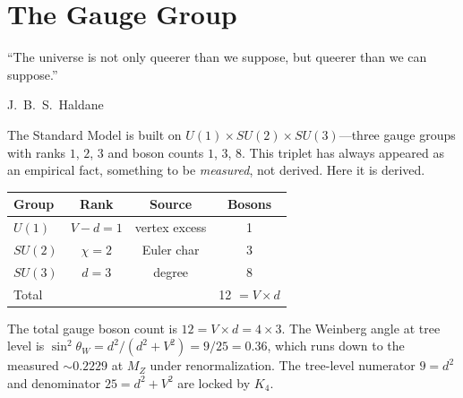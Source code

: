 \documentclass[11pt,a4paper]{book}
\begin{document}
\chapter{The Gauge Group}
\label{ch:gauge-group}

\epigraph{``The universe is not only queerer than we suppose, but queerer than we can suppose.''}{J.~B.~S.~Haldane}

The Standard Model is built on $U(1) \times SU(2) \times SU(3)$---three gauge groups with ranks $1$, $2$, $3$ and boson counts $1$, $3$, $8$. This triplet has always appeared as an empirical fact, something to be \emph{measured}, not derived. Here it is derived.

\begin{center}
\begin{tabular}{lccc}
\toprule
Group    & Rank             & Source          & Bosons \\
\midrule
$U(1)$   & $V - d = 1$      & vertex excess   & 1 \\
$SU(2)$  & $\chi = 2$       & Euler char      & 3 \\
$SU(3)$  & $d = 3$          & degree          & 8 \\
\midrule
Total    &                  &                 & 12 $= V \times d$ \\
\bottomrule
\end{tabular}
\end{center}

The total gauge boson count is $12 = V \times d = 4 \times 3$. The Weinberg angle at tree level is $\sin^2\theta_W = d^2/(d^2 + V^2) = 9/25 = 0.36$, which runs down to the measured $\sim 0.2229$ at $M_Z$ under renormalization. The tree-level numerator $9 = d^2$ and denominator $25 = d^2 + V^2$ are locked by $K_4$.

\end{document}
